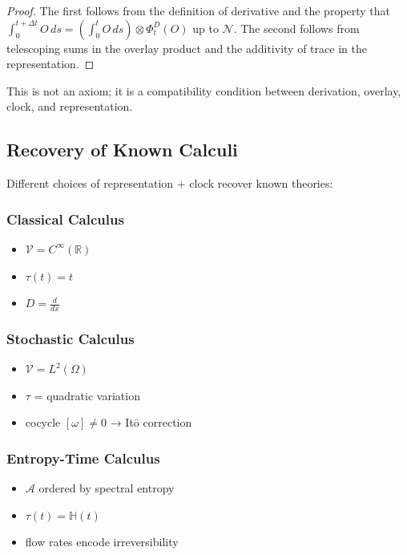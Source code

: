 \documentclass[12pt, oneside]{article}
\newcommand{\N}{\mathcal{N}}
\newcommand{\A}{\mathcal{A}}
\begin{document}
\begin{proof}
The first follows from the definition of derivative and the property that $\int_0^{t+\Delta t} O \, ds = (\int_0^t O \, ds) \otimes \Phi_t^D(O)$ up to $\N$. The second follows from telescoping sums in the overlay product and the additivity of trace in the representation.
\end{proof}

This is not an axiom; it is a compatibility condition between derivation, overlay, clock, and representation.

\subsection{Recovery of Known Calculi}

Different choices of representation + clock recover known theories:

\subsubsection{Classical Calculus}
\begin{itemize}
    \item $\mathcal{V} = C^\infty(\mathbb{R})$
    \item $\tau(t) = t$
    \item $D = \frac{d}{dx}$
\end{itemize}

\subsubsection{Stochastic Calculus}
\begin{itemize}
    \item $\mathcal{V} = L^2(\Omega)$
    \item $\tau$ = quadratic variation
    \item cocycle $[\omega] \neq 0$ → Itō correction
\end{itemize}

\subsubsection{Entropy-Time Calculus}
\begin{itemize}
    \item $\A$ ordered by spectral entropy
    \item $\tau(t) = \mathbb{H}(t)$
    \item flow rates encode irreversibility
\end{itemize}
\end{document}

